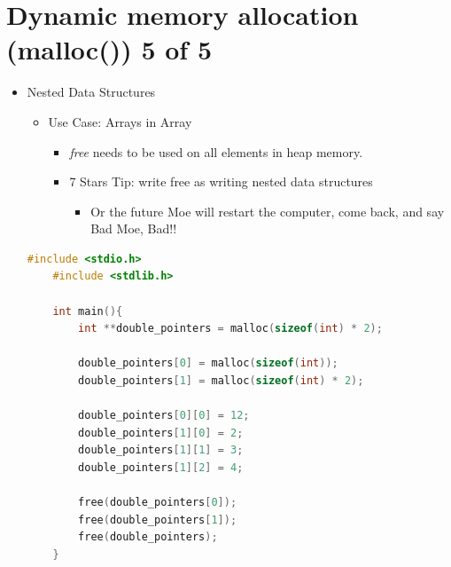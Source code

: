 \documentclass[12pt]{article}
\begin{document}
\bigskip

\section*{Dynamic memory allocation (malloc()) 5 of 5}

\bigskip

\begin{itemize}
    \item Nested Data Structures
    \begin{itemize}
        \item Use Case: Arrays in Array
        \begin{itemize}
            \item \textit{free} needs to be used on all elements in heap memory.
            \item 7 Stars Tip: write free as writing nested data structures
            \begin{itemize}
                \item Or the future Moe will restart the computer, come back, and say Bad Moe, Bad!!
            \end{itemize}
        \end{itemize}
    \end{itemize}

    \begin{lstlisting}[language=c,caption={dynamic\_mem\_example\_5.c}]
    #include <stdio.h>
    #include <stdlib.h>

    int main(){
        int **double_pointers = malloc(sizeof(int) * 2);

        double_pointers[0] = malloc(sizeof(int));
        double_pointers[1] = malloc(sizeof(int) * 2);

        double_pointers[0][0] = 12;
        double_pointers[1][0] = 2;
        double_pointers[1][1] = 3;
        double_pointers[1][2] = 4;

        free(double_pointers[0]);
        free(double_pointers[1]);
        free(double_pointers);
    }
    \end{lstlisting}
\end{itemize}
\end{document}
